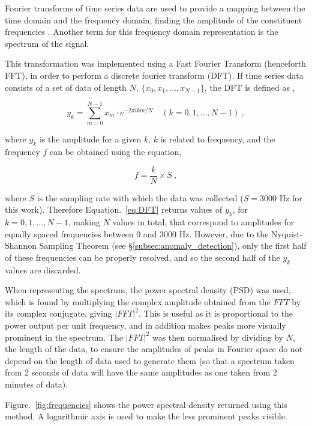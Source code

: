 Fourier transforms of time series data are used to provide a mapping between the time domain and the frequency domain, finding the amplitude of the constituent frequencies \cite{hsu_1984}. Another term for this frequency domain representation is the spectrum of the signal. 

This transformation was implemented using a Fast Fourier Transform (henceforth FFT), in order to perform a discrete fourier transform (DFT). If time series data consists of a set of data of length $N$, $\{ x_0, x_1,...,x_{N-1} \}$, the DFT is defined as \cite{hsu_1984},

\begin{equation}
    y_k = \sum_{m=0}^{N-1} x_m \cdot e^{-2\pi ikm/N} \quad (k = 0,1,...,N-1)~,
    \label{eq:DFT}
\end{equation}

where $y_k$ is the amplitude for a given $k$. $k$ is related to frequency, and the frequency $f$ can be obtained using the equation,

\begin{equation}
    f = \dfrac{k}{N} \times S~,
    \label{eq:freq_from_k}
\end{equation}

where $S$ is the sampling rate with which the data was collected ($S=3000$ Hz for this work). Therefore Equation.~\eqref{eq:DFT} returns values of $y_k$, for $k = 0,1,...,N-1$, making $N$ values in total, that correspond to amplitudes for equally spaced frequencies between $0$ and $3000$ Hz. However, due to the Nyquist-Shannon Sampling Theorem (see \S\ref{subsec:anomaly_detection}), only the first half of these frequencies can be properly resolved, and so the second half of the $y_k$ values are discarded.

When representing the spectrum, the power spectral density (PSD) was used, which is found by multiplying the complex amplitude obtained from the $FFT$ by its complex conjugate, giving $|FFT|^2$. This is useful as it is proportional to the power output per unit frequency, and in addition makes peaks more visually prominent in the spectrum. The $|FFT|^2$ was then normalised by dividing by $N$, the length of the data, to ensure the amplitudes of peaks in Fourier space do not depend on the length of data used to generate them (so that a spectrum taken from 2 seconds of data will have the same amplitudes as one taken from 2 minutes of data).

Figure.~\ref{fig:frequencies} shows the power spectral density returned using this method. A logarithmic axis is used to make the less prominent peaks visible.

